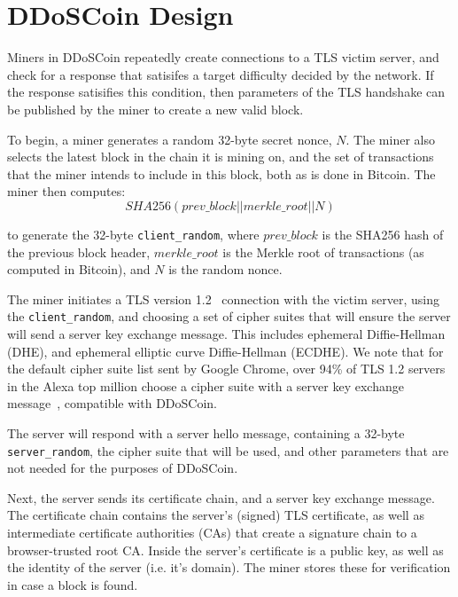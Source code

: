\section{DDoSCoin Design}

\FigOverview

Miners in DDoSCoin repeatedly create connections to a TLS victim server, and
check for a response that satisifes a target difficulty decided by the network.
If the response satisifies this condition, then parameters of the TLS handshake
can be published by the miner to create a new valid block.

To begin, a miner generates a random 32-byte secret nonce, $N$. The miner also
selects the latest block in the chain it is mining on, and the set of
transactions that the miner intends to include in this block, both as is done in
Bitcoin. The miner then computes:
\begin{equation}
SHA256(prev\_block || merkle\_root || N)
\end{equation}

to generate the 32-byte \texttt{client\_random}, where $prev\_block$ is
the SHA256 hash of the previous block header, $merkle\_root$ is the
Merkle root of transactions (as computed in Bitcoin), and $N$ is the random nonce.

The miner initiates a TLS version 1.2~\cite{rfc5246} connection with the victim
server, using the \texttt{client\_random}, and choosing a set of cipher suites
that will ensure the server will send a server key exchange message. This
includes ephemeral Diffie-Hellman (DHE), and ephemeral elliptic curve
Diffie-Hellman (ECDHE). We note that for the default cipher suite list sent by
Google Chrome, over 94\% of TLS 1.2 servers in the Alexa top million choose a
cipher suite with a server key exchange message~\cite{censys}, compatible with
DDoSCoin.


The server will respond with a server hello message, containing a 32-byte
\texttt{server\_random}, the cipher suite that will be used, and other
parameters that are not needed for the purposes of DDoSCoin.

Next, the server sends its certificate chain, and a server key exchange message.
The certificate chain contains the server's (signed) TLS certificate, as well as
intermediate certificate authorities (CAs) that create a signature chain to a
browser-trusted root CA. Inside the server's certificate is a public
key, as well as the identity of the server (i.e. it's domain). The miner stores
these for verification in case a block is found.


